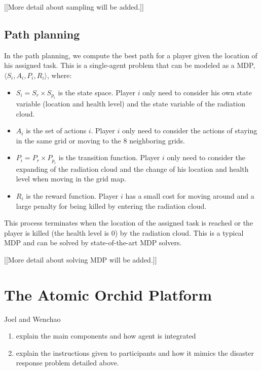 \documentclass{aamas2014}
\begin{document}
[[More detail about sampling will be added.]]

\subsection{Path planning}

In the path planning, we compute the best path for a player given
the location of his assigned task. This is a single-agent problem
that can be modeled as a MDP, $\langle S_i, A_i, P_i, R_i \rangle$,
where:
\begin{itemize}
  \item $S_i = S_r \times S_{p_i}$ is the state space. Player
      $i$ only need to consider his own state variable
      (location and health level) and the state variable of the
      radiation cloud.
  \item $A_i$ is the set of actions $i$. Player $i$ only need
      to consider the actions of staying in the same grid or
      moving to the 8 neighboring grids.
  \item $P_i = P_r \times P_{p_i}$ is the transition function.
      Player $i$ only need to consider the expanding of the
      radiation cloud and the change of his location and health
      level when moving in the grid map.
  \item $R_i$ is the reward function. Player $i$ has a small
      cost for moving around and a large penalty for being
      killed by entering the radiation cloud.
\end{itemize}
This process terminates when the location of the assigned task is
reached or the player is killed (the health level is 0) by the
radiation cloud. This is a typical MDP and can be solved by
state-of-the-art MDP solvers.

[[More detail about solving MDP will be added.]]

\section{The Atomic Orchid Platform}
Joel and Wenchao
\begin{enumerate}
\item explain the main components  and how agent is integrated
\item explain the instructions given to participants and how it mimics the disaster response problem detailed above.
\end{enumerate}
\end{document}
